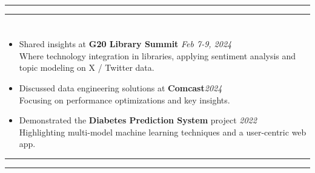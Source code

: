 \documentclass[a4paper,10pt]{article}
\begin{document}
\hrule
\hrule
\section{\scshape\color{Fuchsia}{\faChalkboardTeacher\ \textbf PRESENTATIONS}}
\begin{itemize}
    \item Shared insights at \textbf{G20 Library Summit} \href{https://www.linkedin.com/posts/a-shreehari_g20librarysummit-useremotions-technologyintegration-activity-7163759412841529344-ii6j?utm_source=share&utm_medium=member_desktop}{} \hfill \textit{Feb 7-9, 2024}\\
    Where technology integration in libraries, applying sentiment analysis and topic modeling on X / Twitter data.  
    \vspace{-2mm}
    \item Discussed data engineering solutions at \textbf{Comcast}\hfill \textit{2024}\\
    Focusing on performance optimizations and key insights.
    \vspace{-2mm}
    \item Demonstrated the \textbf{Diabetes Prediction System} project \hfill \textit{2022}\\
    Highlighting multi-model machine learning techniques and a user-centric web app. 
\end{itemize}

\hrule
\hrule
\end{document}
